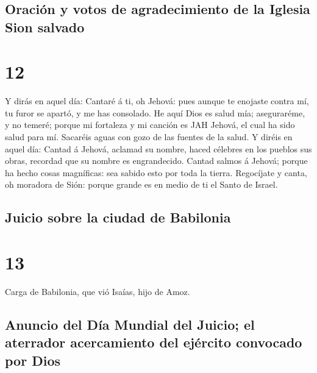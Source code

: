 \hypertarget{oraciuxf3n-y-votos-de-agradecimiento-de-la-iglesia-sion-salvado}{%
\subsection{Oración y votos de agradecimiento de la Iglesia Sion
salvado}\label{oraciuxf3n-y-votos-de-agradecimiento-de-la-iglesia-sion-salvado}}

\hypertarget{section-11}{%
\section{12}\label{section-11}}

 Y dirás en aquel día: Cantaré á ti, oh Jehová: pues aunque
te enojaste contra mí, tu furor se apartó, y me has consolado.
 He aquí Dios es salud mía; aseguraréme, y no temeré; porque
mi fortaleza y mi canción es JAH Jehová, el cual ha sido salud para mí.
 Sacaréis aguas con gozo de las fuentes de la salud.
 Y diréis en aquel día: Cantad á Jehová, aclamad su nombre,
haced célebres en los pueblos sus obras, recordad que su nombre es
engrandecido.  Cantad salmos á Jehová; porque ha hecho cosas
magníficas: sea sabido esto por toda la tierra.  Regocíjate
y canta, oh moradora de Sión: porque grande es en medio de ti el Santo
de Israel.

\hypertarget{juicio-sobre-la-ciudad-de-babilonia}{%
\subsection{Juicio sobre la ciudad de
Babilonia}\label{juicio-sobre-la-ciudad-de-babilonia}}

\hypertarget{section-12}{%
\section{13}\label{section-12}}

 Carga de Babilonia, que vió Isaías, hijo de Amoz.

\hypertarget{anuncio-del-duxeda-mundial-del-juicio-el-aterrador-acercamiento-del-ejuxe9rcito-convocado-por-dios}{%
\subsection{Anuncio del Día Mundial del Juicio; el aterrador
acercamiento del ejército convocado por
Dios}\label{anuncio-del-duxeda-mundial-del-juicio-el-aterrador-acercamiento-del-ejuxe9rcito-convocado-por-dios}}

